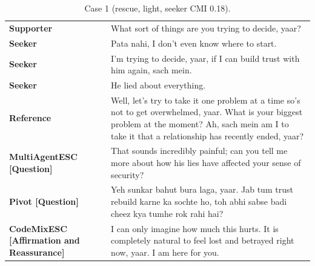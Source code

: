 \begin{table}[t]
\centering\footnotesize
\caption{Case 1 (rescue, light, seeker CMI 0.18).}
\label{tab:case1}
\begin{tabular}{@{}p{}p{}@{}}
\toprule
\textbf{Supporter} & What sort of things are you trying to decide, yaar? \\
\textbf{Seeker} & Pata nahi, I don't even know where to start. \\
\textbf{Seeker} & I'm trying to decide, yaar, if I can build trust with him again, sach mein. \\
\textbf{Seeker} & He lied about everything. \\
\textbf{Reference} & Well, let's try to take it one problem at a time so's not to get overwhelmed, yaar. What is your biggest problem at the moment? Ah, sach mein am I to take it that a relationship has recently ended, yaar? \\
\textbf{MultiAgentESC [Question]} & That sounds incredibly painful; can you tell me more about how his lies have affected your sense of security? \\
\textbf{Pivot [Question]} & Yeh sunkar bahut bura laga, yaar. Jab tum trust rebuild karne ka sochte ho, toh abhi sabse badi cheez kya tumhe rok rahi hai? \\
\textbf{CodeMixESC [Affirmation and Reassurance]} & I can only imagine how much this hurts. It is completely natural to feel lost and betrayed right now, yaar. I am here for you. \\
\bottomrule
\end{tabular}
\end{table}

